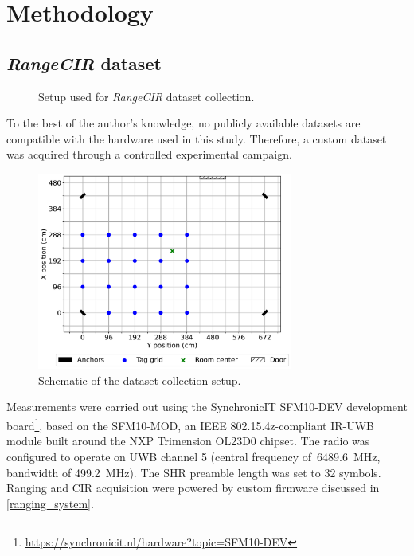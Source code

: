 \chapter{Methodology}

\section{\textit{RangeCIR} dataset}\label{data_collection}

\begin{figure}[tbh]
    \centering
    \caption{Setup used for \textit{RangeCIR} dataset collection.}
    \label{fig:dataset_setup}
\end{figure}

To the best of the author's knowledge, no publicly available datasets are compatible with the hardware used in this study. Therefore, a custom dataset was acquired through a controlled experimental campaign.

\begin{figure}[tbh]
\hspace*{-20pt} %
\includegraphics[width=0.75\textwidth]{Figures/methodology/dataset_scheme.pdf}
\centering
\caption{Schematic of the dataset collection setup.}
\label{fig:exp_topology}
\end{figure}

Measurements were carried out using the SynchronicIT SFM10-DEV development board\footnote{\url{https://synchronicit.nl/hardware?topic=SFM10-DEV}}, based on the SFM10-MOD, an IEEE 802.15.4z-compliant IR-UWB module built around the NXP Trimension OL23D0 chipset. The radio was configured to operate on UWB channel 5 (central frequency of~\SI{6489.6}{\mega\hertz}, bandwidth of \SI{499.2}{\mega\hertz}). The SHR preamble length was set to 32 symbols. Ranging and CIR acquisition were powered by custom firmware discussed in \autoref{ranging_system}. 

